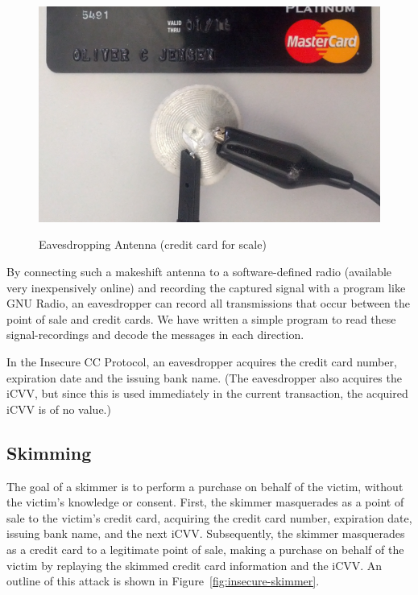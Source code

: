 \begin{figure}
  \caption{Eavesdropping Antenna (credit card for scale)}
  \centering
    \includegraphics[width=1.0\textwidth, clip=true, trim=0 0 0 0]{img/attack-3-eavesdrop-photo.png}
  \label{fig:insecure-eavesdropper-antenna}
\end{figure}

By connecting such a makeshift antenna to a software-defined radio (available very inexpensively online) and recording the captured signal with a program like GNU Radio, an eavesdropper can record all transmissions that occur between the point of sale and credit cards.
We have written a simple program to read these signal-recordings and decode the messages in each direction.

In the Insecure CC Protocol, an eavesdropper acquires the credit card number, expiration date and the issuing bank name.
(The eavesdropper also acquires the iCVV, but since this is used immediately in the current transaction, the acquired iCVV is of no value.)





\subsection{Skimming}
\label{sec:insecure-skimmer}
The goal of a skimmer is to perform a purchase on behalf of the victim, without the victim's knowledge or consent.
First, the skimmer masquerades as a point of sale to the victim's credit card, acquiring the credit card number, expiration date, issuing bank name, and the next iCVV.
Subsequently, the skimmer masquerades as a credit card to a legitimate point of sale, making a purchase on behalf of the victim by replaying the skimmed credit card information and the iCVV.
An outline of this attack is shown in Figure~\ref{fig:insecure-skimmer}.


